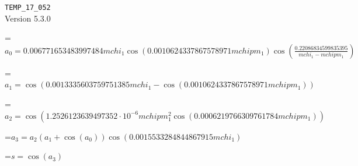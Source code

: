 \documentclass{article}
\newcommand{\exprline}[1]{\par\noindent\begingroup\setbox0=\hbox{$\displaystyle #1$}\ifdim\wd0>\linewidth\resizebox{\linewidth}{!}{\box0}\else\box0\fi\endgroup\par\medskip}
\begin{document}
\noindent\texttt{TEMP\_17\_052}\\
Version 5.3.0\\
\exprline{a_{0} = 0.006771653483997484 mchi_{1} \cos{\left(0.0010624337867578971 mchipm_{1} \right)} \cos{\left(\frac{0.22086834599835395}{mchi_{1} - mchipm_{1}} \right)}}
\exprline{a_{1} = \cos{\left(0.0013335603759751385 mchi_{1} - \cos{\left(0.0010624337867578971 mchipm_{1} \right)} \right)}}
\exprline{a_{2} = \cos{\left(1.2526123639497352 \cdot 10^{-6} mchipm_{1}^{2} \cos{\left(0.0006219766309761784 mchipm_{1} \right)} \right)}}
\exprline{a_{3} = a_{2} \left(a_{1} + \cos{\left(a_{0} \right)}\right) \cos{\left(0.0015533284844867915 mchi_{1} \right)}}
\exprline{s = \cos{\left(a_{3} \right)}}
\end{document}
